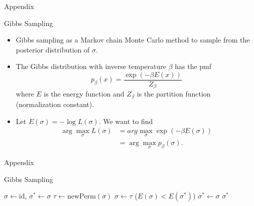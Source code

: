 \documentclass{beamer}
\begin{document}






\begin{frame}{Appendix}

\begin{block}{Gibbs Sampling \cite{menon2020pattern}}
\begin{itemize}
\item Gibbs sampling as a Markov chain Monte Carlo method to sample from the posterior distribution of $\sigma$.
\item The Gibbs distribution with inverse temperature $\beta$ has the pmf 
$$p_{\beta}(x) = \frac{\exp(-\beta E(x))}{Z_{\beta}}$$
where $E$ is the energy function and $Z_{\beta}$ is the partition function (normalization constant).
\item Let $E(\sigma) = -\log L(\sigma)$. We want to find 
\begin{align*}
\arg\max_{\sigma} L(\sigma) &= arg\max_{\sigma} \exp(-\beta E(\sigma)) \\
                          &= \arg\max_{\sigma} p_{\beta}(\sigma).
\end{align*}
\end{itemize}
\end{block}

\end{frame}


\begin{frame}{Appendix}

\begin{block}{Gibbs Sampling \cite{menon2020pattern}}
\end{block}

\vspace{-12pt}

\begin{algorithmic}
\State $\sigma \gets \text{id}$, $\sigma^{*} \gets \sigma$
  \State $\tau \gets \text{newPerm}(\sigma)$
    \State $\sigma \gets \tau$
  \EndIf
  \If($E(\sigma) < E(\sigma^{*})$)
    \State $\sigma^{*} \gets \sigma$
  \EndIf
\EndFor
\State \Return $\sigma^{*}$
\EndProcedure
\end{algorithmic}

\end{frame}
\end{document}

